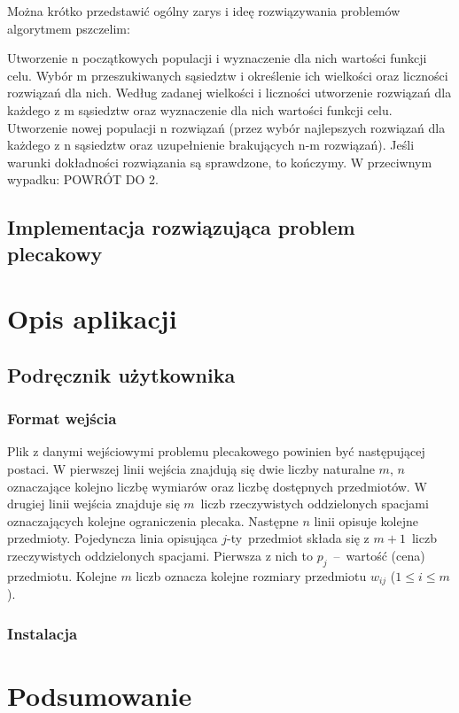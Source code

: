 \documentclass[a4paper,12pt,notitlepage]{mwrep}
\begin{document}
Można krótko przedstawić ogólny zarys i ideę rozwiązywania problemów algorytmem pszczelim:
\begin{enumerate}
	\fe	Utworzenie n początkowych populacji i wyznaczenie dla nich wartości funkcji celu.
	\fe	Wybór m przeszukiwanych sąsiedztw i określenie ich wielkości oraz liczności rozwiązań dla nich.
	\fe	Według zadanej wielkości i liczności utworzenie rozwiązań dla każdego z m sąsiedztw oraz wyznaczenie dla nich wartości funkcji celu.
	\fe	Utworzenie nowej populacji n rozwiązań (przez wybór najlepszych rozwiązań dla każdego z n sąsiedztw oraz uzupełnienie brakujących n-m rozwiązań).
	\fe	Jeśli warunki dokładności rozwiązania są sprawdzone, to kończymy. W przeciwnym wypadku: POWRÓT DO 2.
\end{enumerate}

\section{Implementacja rozwiązująca problem plecakowy}

\chapter{Opis aplikacji}
\section{Podręcznik użytkownika}
\subsection{Format wejścia}
Plik z danymi wejściowymi problemu plecakowego powinien być następującej postaci. W pierwszej
linii wejścia znajdują się dwie liczby naturalne $m$, $n$ oznaczające kolejno liczbę wymiarów
oraz liczbę dostępnych przedmiotów. W drugiej linii wejścia znajduje się $m$~liczb rzeczywistych oddzielonych
spacjami oznaczających kolejne ograniczenia plecaka. Następne $n$ linii opisuje kolejne przedmioty.
Pojedyncza linia opisująca $j$-ty~przedmiot składa się z $m+1$~liczb rzeczywistych oddzielonych spacjami.
Pierwsza z nich to $p_j$~--~wartość (cena)
przedmiotu. Kolejne $m$ liczb oznacza kolejne rozmiary przedmiotu $w_{ij}$  ($1 \le i \le m$).

\subsection{Instalacja}

\chapter{Podsumowanie}
\end{document}
